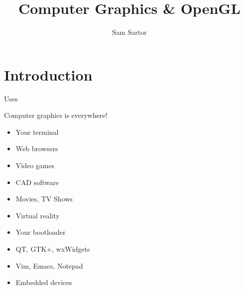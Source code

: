 \documentclass{lug}
\title{Computer Graphics \& OpenGL}
\author{Sam Sartor}
\institute{Mines Linux Users Group}
\begin{document}
\section{Introduction}

\begin{frame}{Uses}
    \noindent
    \begin{minipage}{.65\textwidth}
        Computer graphics is everywhere!
        \begin{itemize}
            \item Your terminal
            \item Web browsers
            \item Video games
            \item CAD software
            \item Movies, TV Shows
            \item Virtual reality
            \item Your bootloader
            \item QT, GTK+, wxWidgets
            \item Vim, Emacs, Notepad
            \item Embedded devices
        \end{itemize}
    \end{minipage}%
    \begin{minipage}{.35\textwidth}

\end{minipage}
\end{frame}
\end{document}
